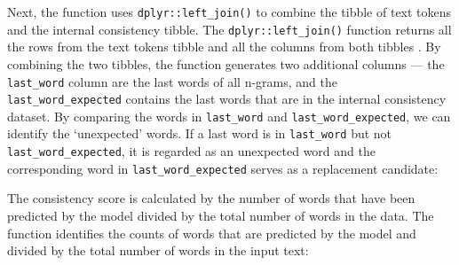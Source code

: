 \documentclass[11pt,]{article}
\newenvironment{Shaded}{\begin{snugshade}}{\end{snugshade}}
\newcommand{\CommentTok}[1]{\textcolor[rgb]{0.56,0.35,0.01}{\textit{#1}}}
\newcommand{\DataTypeTok}[1]{\textcolor[rgb]{0.13,0.29,0.53}{#1}}
\newcommand{\KeywordTok}[1]{\textcolor[rgb]{0.13,0.29,0.53}{\textbf{#1}}}
\newcommand{\NormalTok}[1]{#1}
\newcommand{\OperatorTok}[1]{\textcolor[rgb]{0.81,0.36,0.00}{\textbf{#1}}}
\newcommand{\StringTok}[1]{\textcolor[rgb]{0.31,0.60,0.02}{#1}}
\begin{document}
Next, the function uses \texttt{dplyr::left\_join()} to combine the tibble of text tokens and the internal consistency tibble. The \texttt{dplyr::left\_join()} function returns all the rows from the text tokens tibble and all the columns from both tibbles \citep{2018dplyr}. By combining the two tibbles, the function generates two additional columns --- the \texttt{last\_word} column are the last words of all n-grams, and the \texttt{last\_word\_expected} contains the last words that are in the internal consistency dataset. By comparing the words in \texttt{last\_word} and \texttt{last\_word\_expected}, we can identify the `unexpected' words. If a last word is in \texttt{last\_word} but not \texttt{last\_word\_expected}, it is regarded as an unexpected word and the corresponding word in \texttt{last\_word\_expected} serves as a replacement candidate:

\begin{Shaded}
\end{Shaded}

The consistency score is calculated by the number of words that have been predicted by the model divided by the total number of words in the data. The function identifies the counts of words that are predicted by the model and divided by the total number of words in the input text:
\end{document}
